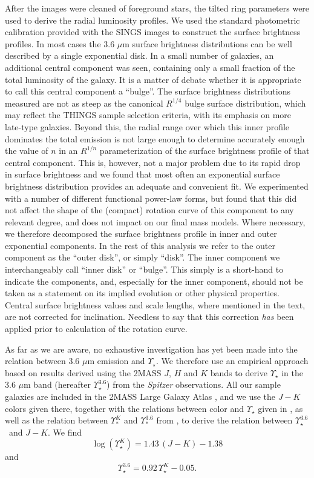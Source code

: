 \documentclass[usenatbib,usegraphicx,apjfonts,floatfix]{emulateapj}
\newcommand{\Ups}{\ensuremath{\Upsilon_{\star}^{3.6}}}
\begin{document}
After the images were cleaned of foreground stars, the tilted ring
parameters were used to derive the radial luminosity profiles. We used
the standard photometric calibration provided with the SINGS images to
construct the surface brightness profiles.  In most cases the 3.6
$\mu$m surface brightness distributions can be well described by a
single exponential disk. In a small number of galaxies, an additional
central component was seen, containing only a small fraction of the
total luminosity of the galaxy.  It is a matter of debate whether it
is appropriate to call this central component a ``bulge''. The surface
brightness distributions measured are not as steep as the canonical
$R^{1/4}$ bulge surface distribution, which may reflect the THINGS
sample selection criteria, with its emphasis on more late-type
galaxies.  Beyond this, the radial range over which this inner profile
dominates the total emission is not large enough to determine
accurately enough the value of $n$ in an $R^{1/n}$ parameterization of
the surface brightness profile of that central component. This is,
however, not a major problem due to its rapid drop in surface
brightness and we found that most often an exponential surface
brightness distribution provides an adequate and convenient fit. We
experimented with a number of different functional power-law forms,
but found that this did not affect the shape of the (compact) rotation
curve of this component to any relevant degree, and does not impact on
our final mass models.  Where necessary, we therefore decomposed the
surface brightness profile in inner and outer exponential
components. In the rest of this analysis we refer to the outer
component as the ``outer disk'', or simply ``disk''. The inner
component we interchangeably call ``inner disk'' or ``bulge''.  This
simply is a short-hand to indicate the components, and,
especially for the inner component, should not be taken as a statement
on its implied evolution or other physical properties. Central surface
brightness values and scale lengths, where mentioned in the text, are
not corrected for inclination. Needless to say that this correction
\emph{has} been applied prior to calculation of the rotation curve.

As far as we are aware, no exhaustive investigation has yet been made
into the relation between 3.6 $\mu$m emission and $\Upsilon_{\star}$.
We therefore use an empirical approach based on results derived using
the 2MASS $J$, $H$ and $K$ bands to derive $\Upsilon_{\star}$ in the
3.6 $\mu$m band (hereafter \Ups) from the \emph{Spitzer} observations.
All our sample galaxies are included in the 2MASS Large Galaxy Atlas
\citep{2mass}, and we use the $J-K$ colors given there, together with
the relations between color and $\Upsilon_{\star}$ given in
\citet{bell_dejong}, as well as the relation between $\Upsilon_*^K$
and $\Upsilon_*^{3.6}$ from \citet{oh2007}, to derive the relation
between \Ups\ and $J-K$. We find
\begin{equation} 
\log(\Upsilon_{\star}^K) = 1.43\, (J-K) - 1.38
\end{equation}
and
\begin{equation}
\Ups = 0.92\, \Upsilon_{\star}^K - 0.05.
\end{equation}
\end{document}
